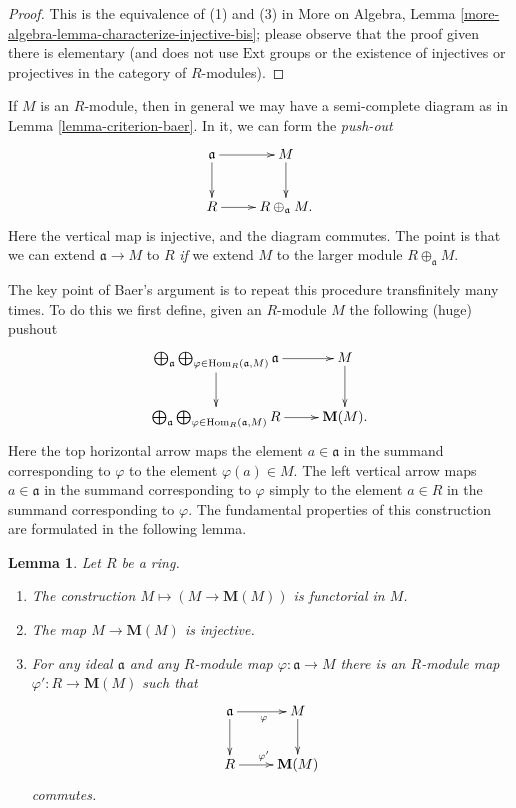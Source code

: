 \documentclass{stacks-project}
\theoremstyle{plain}
\newtheorem{lemma}[subsection]{Lemma}
\theoremstyle{definition}
\theoremstyle{remark}
\numberwithin{equation}{subsection}
\def\Hom{\mathop{\mathrm{Hom}}\nolimits}
\begin{document}
\begin{proof}
This is the equivalence of (1) and (3) in
More on Algebra, Lemma \ref{more-algebra-lemma-characterize-injective-bis};
please observe that the proof given there is elementary
(and does not use $\text{Ext}$ groups or the existence of injectives
or projectives in the category of $R$-modules).
\end{proof}

\noindent
If $M$ is an $R$-module, then in general we may have a semi-complete
diagram as in
Lemma \ref{lemma-criterion-baer}.
In it, we can form the \emph{push-out}
$$
\xymatrix{
\mathfrak{a} \ar[d]  \ar[r] &  M \ar[d] \\
R \ar[r] &  R \oplus_{\mathfrak{a}} M.
}
$$
Here the vertical map is injective, and the diagram commutes. The point is
that we can extend $\mathfrak{a} \to M$ to $R$ \emph{if} we extend $M$ to the
larger module $R \oplus_{\mathfrak{a}} M$.

\medskip\noindent
The key point of Baer's argument is to repeat this procedure
transfinitely many times. To do this we first define, given an $R$-module
$M$ the following (huge) pushout
\begin{equation}
\label{equation-huge-diagram}
\vcenter{
\xymatrix{
\bigoplus_{\mathfrak a}
\bigoplus_{\varphi \in \Hom_R(\mathfrak a, M)}
\mathfrak{a} \ar[r] \ar[d] & M \ar[d] \\
\bigoplus_{\mathfrak a}
\bigoplus_{\varphi \in \Hom_R(\mathfrak a, M)}
R \ar[r] &  \mathbf{M}(M).
}
}
\end{equation}
Here the top horizontal arrow maps the element $a \in \mathfrak a$
in the summand corresponding to $\varphi$ to the element $\varphi(a) \in M$.
The left vertical arrow maps $a \in \mathfrak a$ in the summand corresponding
to $\varphi$ simply to the element $a \in R$ in the summand corresponding
to $\varphi$. The fundamental properties of this construction are
formulated in the following lemma.

\begin{lemma}
\label{lemma-construction}
Let $R$ be a ring.
\begin{enumerate}
\item The construction $M \mapsto (M \to \mathbf{M}(M))$
is functorial in $M$.
\item The map $M \to \mathbf{M}(M)$ is injective.
\item For any ideal $\mathfrak{a}$ and any $R$-module map
$\varphi : \mathfrak a \to M$ there is an $R$-module map
$\varphi' : R \to \mathbf{M}(M)$ such that
$$
\xymatrix{
\mathfrak{a} \ar[d] \ar[r]_\varphi &  M \ar[d] \\
R \ar[r]^{\varphi'} & \mathbf{M}(M)
}
$$
commutes.
\end{enumerate}
\end{lemma}
\end{document}
